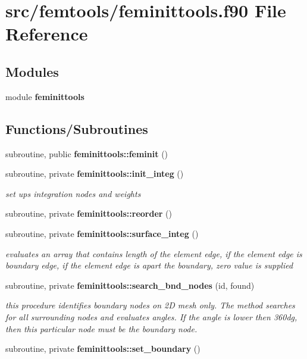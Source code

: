 \section{src/femtools/feminittools.f90 File Reference}
\label{feminittools_8f90}
\subsection*{Modules}
\begin{DoxyCompactItemize}
\item 
module {\bf feminittools}
\end{DoxyCompactItemize}
\subsection*{Functions/\+Subroutines}
\begin{DoxyCompactItemize}
\item 
subroutine, public {\bf feminittools\+::feminit} ()
\item 
subroutine, private {\bf feminittools\+::init\+\_\+integ} ()
\begin{DoxyCompactList}\small\item\em set ups integration nodes and weights \end{DoxyCompactList}\item 
subroutine, private {\bf feminittools\+::reorder} ()
\item 
subroutine, private {\bf feminittools\+::surface\+\_\+integ} ()
\begin{DoxyCompactList}\small\item\em evaluates an array that contains length of the element edge, if the element edge is boundary edge, if the element edge is apart the boundary, zero value is supplied \end{DoxyCompactList}\item 
subroutine, private {\bf feminittools\+::search\+\_\+bnd\+\_\+nodes} (id, found)
\begin{DoxyCompactList}\small\item\em this procedure identifies boundary nodes on 2D mesh only. The method searches for all surrounding nodes and evaluates angles. If the angle is lower then 360dg, then this particular node must be the boundary node. \end{DoxyCompactList}\item 
subroutine, private {\bf feminittools\+::set\+\_\+boundary} ()
\end{DoxyCompactItemize}

